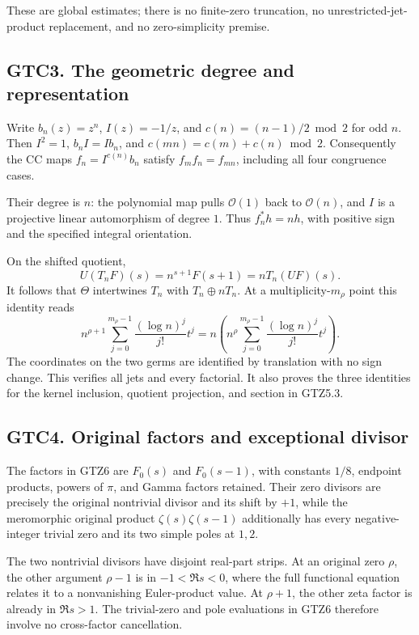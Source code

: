 These are global estimates; there is no finite-zero truncation, no
unrestricted-jet-product replacement, and no zero-simplicity premise.

\subsection{GTC3. The geometric degree and
representation}\label{gtc3.-the-geometric-degree-and-representation}

Write \(b_n(z)=z^n\), \(I(z)=-1/z\), and \(c(n)=(n-1)/2\bmod2\) for odd
\(n\). Then \(I^2=1\), \(b_nI=Ib_n\), and \(c(mn)=c(m)+c(n)\bmod2\).
Consequently the CC maps \(f_n=I^{c(n)}b_n\) satisfy \(f_mf_n=f_{mn}\),
including all four congruence cases.

Their degree is \(n\): the polynomial map pulls \(\mathcal O(1)\) back
to \(\mathcal O(n)\), and \(I\) is a projective linear automorphism of
degree \(1\). Thus \(f_n^*h=nh\), with positive sign and the specified
integral orientation.

On the shifted quotient, \[
U(T_nF)(s)=n^{s+1}F(s+1)=nT_n(UF)(s).
\] It follows that \(\Theta\) intertwines \(T_n\) with
\(T_n\oplus nT_n\). At a multiplicity-\(m_\rho\) point this identity
reads \[
n^{\rho+1}\sum_{j=0}^{m_\rho-1}
\frac{(\log n)^j}{j!}t^j
=n\left(n^\rho\sum_{j=0}^{m_\rho-1}
\frac{(\log n)^j}{j!}t^j\right).
\] The coordinates on the two germs are identified by translation with
no sign change. This verifies all jets and every factorial. It also
proves the three identities for the kernel inclusion, quotient
projection, and section in GTZ5.3.

\subsection{GTC4. Original factors and exceptional
divisor}\label{gtc4.-original-factors-and-exceptional-divisor}

The factors in GTZ6 are \(F_0(s)\) and \(F_0(s-1)\), with constants
\(1/8\), endpoint products, powers of \(\pi\), and Gamma factors
retained. Their zero divisors are precisely the original nontrivial
divisor and its shift by \(+1\), while the meromorphic original product
\(\zeta(s)\zeta(s-1)\) additionally has every negative-integer trivial
zero and its two simple poles at \(1,2\).

The two nontrivial divisors have disjoint real-part strips. At an
original zero \(\rho\), the other argument \(\rho-1\) is in
\(-1<\Re s<0\), where the full functional equation relates it to a
nonvanishing Euler-product value. At \(\rho+1\), the other zeta factor
is already in \(\Re s>1\). The trivial-zero and pole evaluations in GTZ6
therefore involve no cross-factor cancellation.

